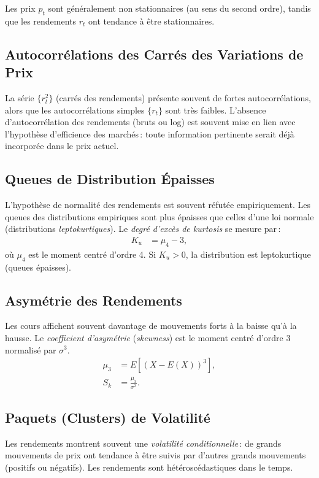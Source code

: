 \documentclass[14pt]{extarticle} %
\begin{document}
Les prix \(p_t\) sont généralement non stationnaires (au sens du second ordre), tandis que les rendements \(r_t\) ont tendance à être stationnaires.

\subsection{Autocorrélations des Carrés des Variations de Prix}

La série \(\{r_t^2\}\) (carrés des rendements) présente souvent de fortes autocorrélations, alors que les autocorrélations simples \(\{r_t\}\) sont très faibles. L’absence d’autocorrélation des rendements (bruts ou log) est souvent mise en lien avec l’hypothèse d’efficience des marchés : toute information pertinente serait déjà incorporée dans le prix actuel.

\subsection{Queues de Distribution Épaisses}

L’hypothèse de normalité des rendements est souvent réfutée empiriquement. Les queues des distributions empiriques sont plus épaisses que celles d’une loi normale (distributions \emph{leptokurtiques}). Le \emph{degré d’excès de kurtosis} se mesure par :
\begin{align*}
    K_u &= \mu_4 - 3,
\end{align*}
où \(\mu_4\) est le moment centré d’ordre 4. Si \(K_u > 0\), la distribution est leptokurtique (queues épaisses).

\subsection{Asymétrie des Rendements}

Les cours affichent souvent davantage de mouvements forts à la baisse qu’à la hausse. Le \emph{coefficient d’asymétrie} (\emph{skewness}) est le moment centré d’ordre 3 normalisé par \(\sigma^3\).
\begin{align*}
    \mu_3 &= E[(X - E(X))^3], \\
    S_k &= \frac{\mu_3}{\sigma^3}.
\end{align*}

\subsection{Paquets (Clusters) de Volatilité}

Les rendements montrent souvent une \emph{volatilité conditionnelle} : de grands mouvements de prix ont tendance à être suivis par d’autres grands mouvements (positifs ou négatifs). Les rendements sont hétéroscédastiques dans le temps.
\end{document}
